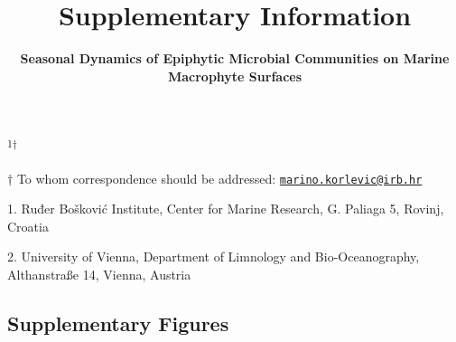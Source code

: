 \documentclass[12pt,]{article}
\title{\textbf{Supplementary Information}}
\subtitle{\textbf{Seasonal Dynamics of Epiphytic Microbial Communities on Marine
Macrophyte Surfaces}}
\author{}
\date{}
\begin{document}
\maketitle

\vspace{70mm}

\textsuperscript{1\(\dagger\)}

\vspace{40mm}

\(\dagger\) To whom correspondence should be addressed:
\href{mailto:marino.korlevic@irb.hr}{\nolinkurl{marino.korlevic@irb.hr}}

1. Ruđer Bošković Institute, Center for Marine Research, G. Paliaga 5,
Rovinj, Croatia

2. University of Vienna, Department of Limnology and Bio-Oceanography,
Althanstraße 14, Vienna, Austria

\linenumbers
{}
\setlength\parindent{24pt}

\hypertarget{supplementary-figures}{%
\subsection{Supplementary Figures}\label{supplementary-figures}}
\end{document}
